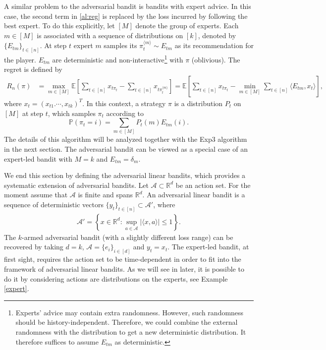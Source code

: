 \documentclass[letterpaper,11pt,openright,openany]{book}
\numberwithin{equation}{section}
\theoremstyle{plain}
\theoremstyle{definition}
\def\R{{\mathbb R}}
\def\E{{\mathbb E}}
\def\R{{\mathbb R}}
\def\P{{\mathbb P}}
\begin{document}
A similar problem to the adversarial bandit is bandits with expert advice. 
In this case, the second term in \eqref{al:reg} is replaced by the loss incurred by following the best expert.
To do this explicitly, let $[M]$ denote the group of experts. 
Each $m\in [M]$ is associated with a sequence of distributions on $[k]$, denoted by $\{E_{tm}\}_{t\in [n]}$.  
At step $t$ expert $m$ samples its $\pi_t^{\langle m\rangle}\sim E_{tm}$ as its recommendation for the player.
$E_{tm}$ are deterministic and non-interactive\footnote{Experts' advice may contain extra randomness. However, such randomness should be history-independent. Therefore, we could combine the external randomness with the distribution to get a new deterministic distribution. It therefore suffices to assume $E_{tm}$ as deterministic.} with $\pi$ (oblivious).  
The regret is defined by
\begin{align}
R_n(\pi) &=  \max_{m\in [M]}\E\left[\sum_{t\in [n]}x_{t\pi_t}-\sum_{t\in [n]}x_{t\pi_t^{\langle m\rangle}}\right]= \E\left[\sum_{t\in [n]}x_{t\pi_t}-\min_{m\in [M]}\sum_{t\in [n]}\langle E_{tm}, x_{t}\rangle\right],\label{al:1*}
\end{align}
where $x_t = (x_{t1}.\cdots, x_{tk})^T$. In this context, a strategy $\pi$ is a distribution $P_t$ on $[M]$ at step $t$, which samples $\pi_t$ according to $$\P\left(\pi_t = i\right)=\sum_{m\in [M]}P_t(m)E_{tm}(i).$$ 
The details of this algorithm will be analyzed together with the Exp3 algorithm in the next section. 
The adversarial bandit can be viewed as a special case of an expert-led bandit with $M=k$ and $E_{tm} = \delta_m$.

We end this section by defining the adversarial linear bandits, which provides a systematic extension of adversarial bandits. Let $\mathcal A\subset\R^d$ be an action set. For the moment assume that $\mathcal A$ is finite and spans $\R^d$.  An adversarial linear bandit is a sequence of deterministic vectors $\{y_t\}_{t\in [n]}\subset\mathcal A'$, where  
\begin{align*}
\mathcal A' = \left\{x\in\R^d: \sup_{a\in\mathcal A}|\langle x, a\rangle|\leq 1\right\}. 
\end{align*}
The $k$-armed adversarial bandit (with a slightly different loss range) can be recovered by taking $d = k$, $\mathcal A=\{e_i\}_{i\in [d]}$ and $y_t = x_t$. 
The expert-led bandit, at first sight, requires the action set to be time-dependent in order to fit into the framework of adversarial linear bandits. As we will see in later, it is possible to do it by considering actions are distributions on the experts, see Example \ref{expert}. 
\end{document}
